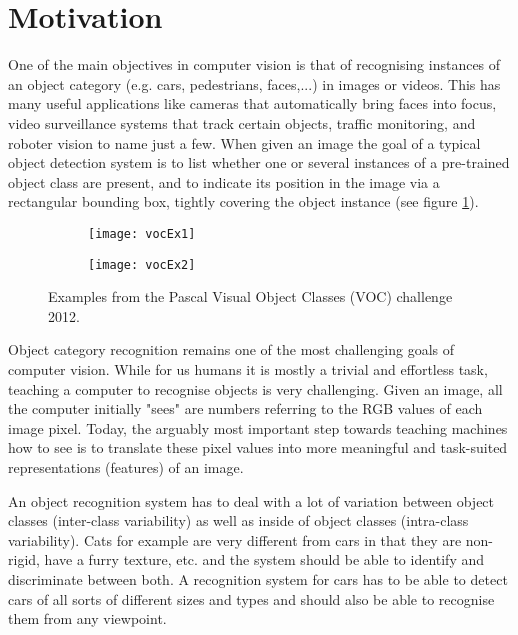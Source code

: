 \section{Motivation}

One of the main objectives in computer vision is that of recognising instances of an object category (e.g. cars, pedestrians, faces,...) in images or videos. This has many useful applications like cameras that automatically bring faces into focus, video surveillance systems that track certain objects, traffic monitoring, and roboter vision to name just a few. When given an image the goal of a typical object detection system is to list whether one or several instances of a pre-trained object class are present, and to indicate its position in the image via a rectangular bounding box, tightly covering the object instance (see figure \ref{fig:vocEx}).
\begin{figure}
\begin{center}
        \begin{subfigure}[b]{0.49\textwidth}
                \texttt{[image: vocEx1]}
        \end{subfigure}
        \begin{subfigure}[b]{0.49\textwidth}
               \texttt{[image: vocEx2]}
        \end{subfigure}
\caption{Examples from the Pascal Visual Object Classes (VOC) challenge 2012. \cite{pascal-voc-2012}}
\label{fig:vocEx}
\end{center}
\end{figure}

Object category recognition remains one of the most challenging goals of computer vision. While for us humans it is mostly a trivial and effortless task, teaching a computer to recognise objects is very challenging. Given an image, all the computer initially "sees" are numbers referring to the RGB values of each image pixel. Today, the arguably most important step towards teaching machines how to see is to translate these pixel values into more meaningful and task-suited representations (features) of  an image. 

An object recognition system has to deal with a lot of variation between object classes (inter-class variability) as well as inside of object classes (intra-class variability). Cats for example are very different from cars in that they are non-rigid, have a furry texture, etc. and the system should be able to identify and discriminate between both. A recognition system for cars has to be able to detect cars of all sorts of different sizes and types and should also be able to recognise them from any viewpoint. 

